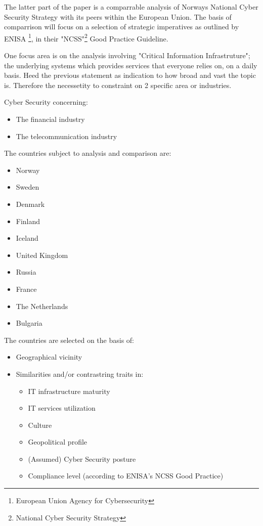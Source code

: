 The latter part of the paper is a comparrable analysis of Norways National Cyber Security Strategy with its peers within the European Union. The basis of comparrison will focus on a selection of strategic imperatives as outlined by ENISA \footnote{European Union Agency for Cybersecurity}, in their {\emph{}{"NCSS"}}\footnote{National Cyber Security Strategy} Good Practice Guideline.

One focus area is on the analysis involving "Critical Information Infrastruture"; the underlying systems which provides services that everyone relies on, on a daily basis. Heed the previous statement as indication to how broad and vast the topic is. Therefore the necessetity to constraint on 2 specific area or industries.

Cyber Security concerning:
\begin{itemize}
    \item The financial industry
    \item The telecommunication industry
\end{itemize}

The countries subject to analysis and comparison are:
\begin{itemize}
    \item Norway
    \item Sweden
    \item Denmark
    \item Finland
    \item Iceland
    \item United Kingdom
    \item Russia
    \item France
    \item The Netherlands
    \item Bulgaria
\end{itemize}

The countries are selected on the basis of:
\begin{itemize}
    \item Geographical vicinity
    \item Similarities and/or contrastring traits in:
    \begin{itemize}
        \item IT infrastructure maturity
        \item IT services utilization
        \item Culture
        \item Geopolitical profile
        \item (Assumed) Cyber Security posture
        \item Compliance level (according to ENISA's NCSS Good Practice)
    \end{itemize}
\end{itemize}

